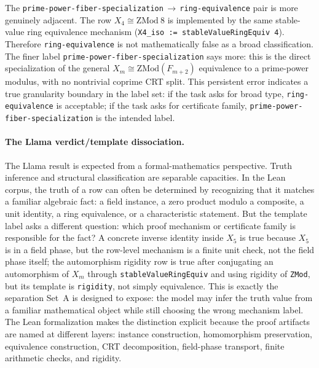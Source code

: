 \documentclass[11pt]{article}
\begin{document}
The \texttt{prime{-}power{-}fiber{-}specialization}\,$\to$\,\texttt{ring{-}equivalence}
pair is more genuinely adjacent.
The row $X_4 \cong \mathrm{ZMod}\ 8$ is implemented by the same stable-value
ring equivalence mechanism (\texttt{X4\_iso := stableValueRingEquiv 4}).
Therefore \texttt{ring-equivalence} is not mathematically false as a broad
classification.
The finer label \texttt{prime-power-fiber-specialization} says more: this is
the direct specialization of the general $X_m \cong \mathrm{ZMod}(F_{m+2})$
equivalence to a prime-power modulus, with no nontrivial coprime CRT split.
This persistent error indicates a true granularity boundary in the label
set: if the task asks for broad type, \texttt{ring-equivalence} is
acceptable; if the task asks for certificate family,
\texttt{prime-power-fiber-specialization} is the intended label.

\paragraph{The Llama verdict/template dissociation.}
The Llama result is expected from a formal-mathematics perspective.
Truth inference and structural classification are separable capacities.
In the Lean corpus, the truth of a row can often be determined by
recognizing that it matches a familiar algebraic fact: a field instance, a
zero product modulo a composite, a unit identity, a ring equivalence, or a
characteristic statement.
But the template label asks a different question: which proof mechanism or
certificate family is responsible for the fact?
A concrete inverse identity inside $X_5$ is true because $X_5$ is in a field
phase, but the row-level mechanism is a finite unit check, not the field
phase itself; the automorphism rigidity row is true after conjugating an
automorphism of $X_m$ through \texttt{stableValueRingEquiv} and using
rigidity of \texttt{ZMod}, but its template is \texttt{rigidity}, not simply
equivalence.
This is exactly the separation Set~A is designed to expose: the model may
infer the truth value from a familiar mathematical object while still
choosing the wrong mechanism label.
The Lean formalization makes the distinction explicit because the proof
artifacts are named at different layers: instance construction, homomorphism
preservation, equivalence construction, CRT decomposition, field-phase
transport, finite arithmetic checks, and rigidity.
\end{document}
